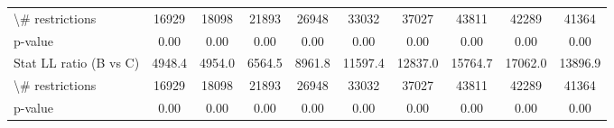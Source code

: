 \documentclass[11pt,twoside, authoryear]{elsarticle}
\begin{document}
\begin{landscape}
\begin{table}[htbp]
{\begin{tabular}{l|c|c|c|c|c|c|c|c|c}
    \textbackslash{}\# restrictions & \multicolumn{1}{c}{16929} & \multicolumn{1}{c}{18098} & \multicolumn{1}{c}{21893} & \multicolumn{1}{c}{26948} & \multicolumn{1}{c}{33032} & \multicolumn{1}{c}{37027} & \multicolumn{1}{c}{43811} & \multicolumn{1}{c}{42289} & \multicolumn{1}{c}{41364} \\
    p-value & \multicolumn{1}{c}{0.00} & \multicolumn{1}{c}{0.00} & \multicolumn{1}{c}{0.00} & \multicolumn{1}{c}{0.00} & \multicolumn{1}{c}{0.00} & \multicolumn{1}{c}{0.00} & \multicolumn{1}{c}{0.00} & \multicolumn{1}{c}{0.00} & \multicolumn{1}{c}{0.00} \\ \hline
    Stat LL ratio (B vs C) & \multicolumn{1}{c}{4948.4} & \multicolumn{1}{c}{4954.0} & \multicolumn{1}{c}{6564.5} & \multicolumn{1}{c}{8961.8} & \multicolumn{1}{c}{11597.4} & \multicolumn{1}{c}{12837.0} & \multicolumn{1}{c}{15764.7} & \multicolumn{1}{c}{17062.0} & \multicolumn{1}{c}{13896.9} \\
    \textbackslash{}\# restrictions & \multicolumn{1}{c}{16929} & \multicolumn{1}{c}{18098} & \multicolumn{1}{c}{21893} & \multicolumn{1}{c}{26948} & \multicolumn{1}{c}{33032} & \multicolumn{1}{c}{37027} & \multicolumn{1}{c}{43811} & \multicolumn{1}{c}{42289} & \multicolumn{1}{c}{41364} \\
    p-value & \multicolumn{1}{c}{0.00} & \multicolumn{1}{c}{0.00} & \multicolumn{1}{c}{0.00} & \multicolumn{1}{c}{0.00} & \multicolumn{1}{c}{0.00} & \multicolumn{1}{c}{0.00} & \multicolumn{1}{c}{0.00} & \multicolumn{1}{c}{0.00} & \multicolumn{1}{c}{0.00} \\ \hline \hline
\end{tabular}%
}
\end{table}%
\end{landscape}
\end{document}

